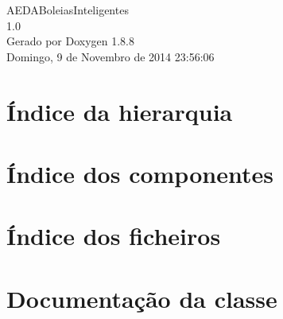 \documentclass[twoside]{book}
\newcommand{\+}{\discretionary{\mbox{\scriptsize$\hookleftarrow$}}{}{}}
\newcommand{\clearemptydoublepage}{%
  \newpage{\pagestyle{empty}\cleardoublepage}%
}
\begin{document}
\hypersetup{pageanchor=false,
             bookmarks=true,
             bookmarksnumbered=true,
             pdfencoding=unicode
            }
\begin{titlepage}
\vspace*{7cm}
\begin{center}%
{\Large A\+E\+D\+A\+Boleias\+Inteligentes \\[1ex]\large 1.\+0 }\\
\vspace*{1cm}
{\large Gerado por Doxygen 1.8.8}\\
\vspace*{0.5cm}
{\small Domingo, 9 de Novembro de 2014 23:56:06}\\
\end{center}
\end{titlepage}
\clearemptydoublepage
\tableofcontents
\clearemptydoublepage
{}
\hypersetup{pageanchor=true}

\chapter{Índice da hierarquia}

\chapter{Índice dos componentes}

\chapter{Índice dos ficheiros}

\chapter{Documentação da classe}





























\end{document}
